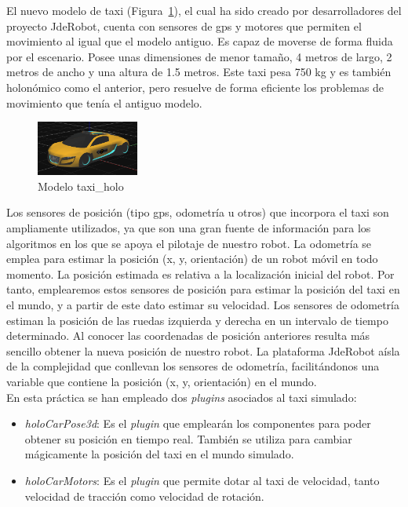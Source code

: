 El nuevo modelo de taxi (Figura~\ref{fig.coche_holo}), el cual ha sido creado por desarrolladores del proyecto JdeRobot, cuenta con sensores de \acrshort{gps} y motores que permiten el movimiento al igual que el modelo antiguo. Es capaz de moverse de forma fluida por el escenario. Posee unas dimensiones de menor tamaño, 4 metros de largo, 2 metros de ancho y una altura de 1.5 metros. Este taxi pesa 750 kg y es también holonómico como el anterior, pero resuelve de forma eficiente los problemas de movimiento que tenía el antiguo modelo. 

\begin{figure}[H]
  \begin{center}
    \includegraphics[width=0.3\textwidth]{figures/GPP/Coche_holo.png}
		\caption{Modelo taxi\_holo}
		\label{fig.coche_holo}
		\end{center}
\end{figure}

Los sensores de posición (tipo \acrshort{gps}, odometría u otros) que incorpora el taxi son ampliamente utilizados, ya que son una gran fuente de información para los algoritmos en los que se apoya el pilotaje de nuestro robot. La odometría se emplea para estimar la posición (x, y, orientación) de un robot móvil en todo momento. La posición estimada es relativa a la localización inicial del robot. Por tanto, emplearemos estos sensores de posición para estimar la posición del taxi en el mundo, y a partir de este dato estimar su velocidad.  Los sensores de odometría estiman la posición de las ruedas izquierda y derecha en un intervalo de tiempo determinado. Al conocer las coordenadas de posición anteriores resulta más sencillo obtener la nueva posición de nuestro robot. La plataforma JdeRobot aísla de la complejidad que conllevan los sensores de odometría, facilitándonos una variable que contiene la posición (x, y, orientación) en el mundo.\\


En esta práctica se han empleado dos \textit{plugins} asociados al taxi simulado: 

\begin{itemize}
\item \textit{holoCarPose3d}: Es el \textit{plugin} que emplearán los componentes para poder obtener su posición en tiempo real. También se utiliza para cambiar mágicamente la posición del taxi en el mundo simulado.
\item \textit{holoCarMotors}: Es el \textit{plugin} que permite dotar al taxi de velocidad, tanto velocidad de tracción como velocidad de rotación. 
\end{itemize}

